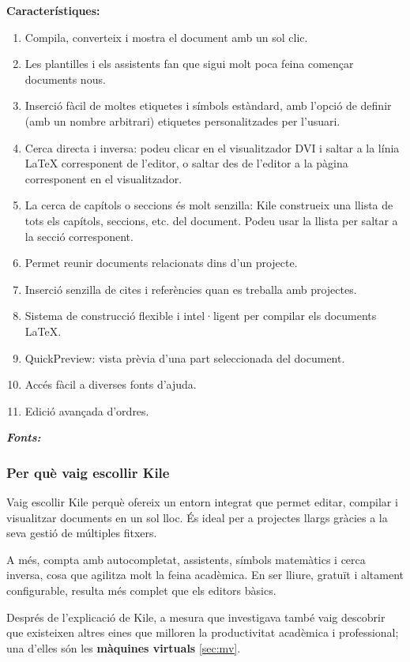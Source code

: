 \textbf{Característiques:}
\begin{enumerate}
 \item Compila, converteix i mostra el document amb un sol clic.
 \item Les plantilles i els assistents fan que sigui molt poca feina començar documents nous.
 \item Inserció fàcil de moltes etiquetes i símbols estàndard, amb l’opció de definir (amb un nombre arbitrari) etiquetes personalitzades per l’usuari.
 \item Cerca directa i inversa: podeu clicar en el visualitzador DVI i saltar a la línia LaTeX corresponent de l’editor, o saltar des de l’editor a la pàgina corresponent en el visualitzador.
 \item La cerca de capítols o seccions és molt senzilla: Kile construeix una llista de tots els capítols, seccions, etc. del document. Podeu usar la llista per saltar a la secció corresponent.
 \item Permet reunir documents relacionats dins d’un projecte.
 \item Inserció senzilla de cites i referències quan es treballa amb projectes.
 \item Sistema de construcció flexible i intel·ligent per compilar els documents LaTeX.
 \item QuickPreview: vista prèvia d’una part seleccionada del document.
 \item Accés fàcil a diverses fonts d’ajuda.
 \item Edició avançada d’ordres.
\end{enumerate}
\textit{\textbf{Fonts:}} \cite{KDE}\\
\subsubsection{Per què vaig escollir Kile}
Vaig escollir Kile perquè ofereix un entorn integrat que permet editar, compilar i visualitzar documents en un sol lloc. És ideal per a projectes llargs gràcies a la seva gestió de múltiples fitxers.

A més, compta amb autocompletat, assistents, símbols matemàtics i cerca inversa, cosa que agilitza molt la feina acadèmica. En ser lliure, gratuït i altament configurable, resulta més complet que els editors bàsics.

Després de l’explicació de Kile, a mesura que investigava també vaig descobrir que existeixen altres eines que milloren la productivitat acadèmica i professional; una d’elles són les \textbf{màquines virtuals} \ref{sec:mv}.


